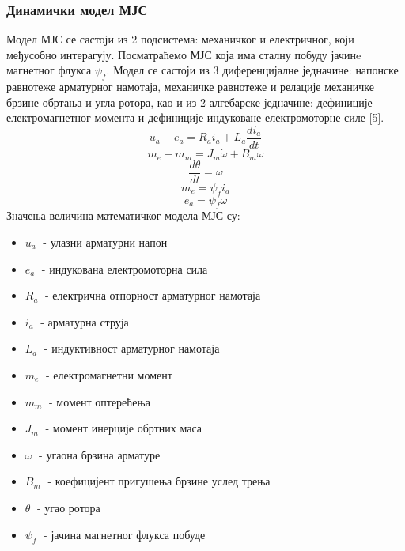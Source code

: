 \documentclass[12pt]{article}
\begin{document}
\subsubsection{Динамички модел МЈС}
Модел МЈС се састоји из 2 подсистема: механичког и електричног, који међусобно интерагују. Посматраћемо МЈС која има сталну побуду јачинe магнетног флукса $\psi _f$. Модел се састоји из 3 диференцијалне једначине: напонске равнотеже арматурног намотаја, механичке равнотеже и релације механичке брзине обртања и угла ротора, као и из 2 алгебарске једначине: дефиниције електромагнетног момента и дефиниције индуковане електромоторне силе [5].
\begin{equation}
    u_a-e_a=R_ai_a+L_a\dfrac{di_a}{dt}
\end{equation}
\begin{equation}
    m_e-m_m=J_m \dot\omega+B_m\omega
\end{equation}
\begin{equation}
    \dfrac{d\theta}{dt}=\omega
\end{equation}
\begin{equation}
    m_e=\psi _fi_a
\end{equation}
\begin{equation}
    e_a=\psi _f\omega
\end{equation}
Значења величина математичког модела МЈС су:
\begin{itemize}
    \item $u_a\;$ - улазни арматурни напон
    \item $e_a\;$ - индукована електромоторна сила
    \item $R_a\;$ - електрична отпорност арматурног намотаја
    \item $i_a\;$ - арматурна струја
    \item $L_a\;$ - индуктивност арматурног намотаја
    \item $m_e\;$ - електромагнетни момент
    \item $m_m\;$ - момент оптерећења
    \item $J_m\;$ - момент инерције обртних маса
    \item $\omega\;$ - угаона брзина арматуре
    \item $B_m\;$ - коефицијент пригушења брзине услед трења
    \item $\theta\;$ - угао ротора
    \item $\psi _f\;$ - јачина магнетног флукса побуде
\end{itemize}
\end{document}
